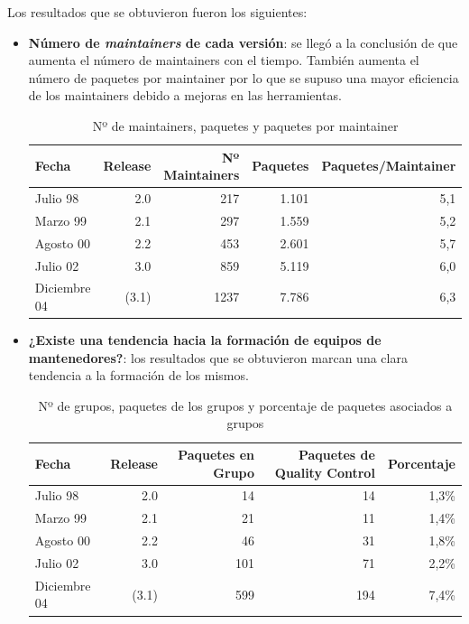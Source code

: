 \documentclass[a4paper, 12pt]{book}
\begin{document}
Los resultados que se obtuvieron fueron los siguientes:
\begin{itemize}
	\item \textbf {Número de \emph{maintainers} de cada versión}: se llegó a la conclusión de que aumenta el número de maintainers con el tiempo. También aumenta el número de paquetes por maintainer por lo que se supuso una mayor eficiencia de los maintainers debido a mejoras en las herramientas.
	
	\begin{table}[]
		\begin{tabular}{|l|r|r|r|r|}
			\hline
			Fecha        & Release & Nº Maintainers & Paquetes & Paquetes/Maintainer \\ \hline
			Julio 98     & 2.0     & 217           & 1.101    & 5,1                 \\ \hline
			Marzo 99    & 2.1     & 297           & 1.559    & 5,2                 \\ \hline
			Agosto 00   & 2.2     & 453           & 2.601    & 5,7                 \\ \hline
			Julio 02     & 3.0     & 859           & 5.119    & 6,0                 \\ \hline
			Diciembre 04 & (3.1)   & 1237          & 7.786    & 6,3                 \\ \hline
		\end{tabular}
		\caption{Nº de maintainers, paquetes y paquetes por maintainer}
	\end{table}
	
	\item \textbf {¿Existe una tendencia hacia la formación de equipos de 
	mantenedores?}: los resultados que se obtuvieron marcan una clara tendencia a la formación de los mismos.
	
	\begin{table}[h]
		\begin{tabular}{|l|r|r|r|r|}
			\hline
			Fecha        & Release & Paquetes en Grupo & Paquetes de Quality Control & Porcentaje \\ \hline
			Julio 98     & 2.0     & 14             & 14                       & 1,3\%      \\ \hline
			Marzo 99    & 2.1     & 21             & 11                       & 1,4\%      \\ \hline
			Agosto 00   & 2.2     & 46             & 31                       & 1,8\%      \\ \hline
			Julio 02     & 3.0     & 101            & 71                       & 2,2\%      \\ \hline
			Diciembre 04 & (3.1)   & 599            & 194                      & 7,4\%      \\ \hline
		\end{tabular}
		\caption{Nº de grupos, paquetes de los grupos y porcentaje de paquetes asociados a grupos}
	\end{table}
	

\end{itemize}
\end{document}
